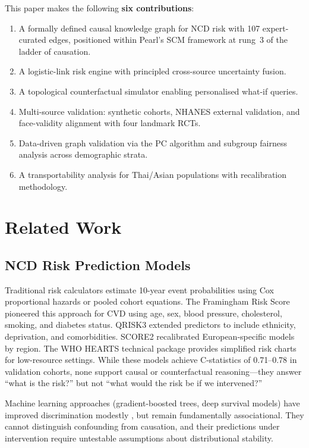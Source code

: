 \documentclass[runningheads]{llncs}
\begin{document}
This paper makes the following \textbf{six contributions}:
\begin{enumerate}
\item[(C1)] A formally defined causal knowledge graph for NCD risk
  with 107 expert-curated edges, positioned within Pearl's SCM
  framework at rung~3 of the ladder of causation.
\item[(C2)] A logistic-link risk engine with principled cross-source
  uncertainty fusion.
\item[(C3)] A topological counterfactual simulator enabling
  personalised what-if queries.
\item[(C4)] Multi-source validation: synthetic cohorts, NHANES
  external validation, and face-validity alignment with four landmark
  RCTs.
\item[(C5)] Data-driven graph validation via the PC algorithm and
  subgroup fairness analysis across demographic strata.
\item[(C6)] A transportability analysis for Thai/Asian populations
  with recalibration methodology.
\end{enumerate}

\section{Related Work}\label{sec:related}

\subsection{NCD Risk Prediction Models}

Traditional risk calculators estimate 10-year event probabilities
using Cox proportional hazards or pooled cohort equations.  The
Framingham Risk Score \cite{dagostino2008framingham} pioneered this
approach for CVD using age, sex, blood pressure, cholesterol, smoking,
and diabetes status.  QRISK3 \cite{hippisley2017qrisk3} extended
predictors to include ethnicity, deprivation, and comorbidities.
SCORE2 \cite{score22021} recalibrated European-specific models by
region.  The WHO HEARTS technical package \cite{who2016hearts}
provides simplified risk charts for low-resource settings.  While
these models achieve C-statistics of 0.71--0.78 in validation
cohorts, none support causal or counterfactual reasoning---they
answer ``what is the risk?'' but not ``what would the risk be if we
intervened?''

Machine learning approaches (gradient-boosted trees, deep survival
models) have improved discrimination modestly
\cite{alaa2019attentive}, but remain fundamentally associational.
They cannot distinguish confounding from causation, and their
predictions under intervention require untestable assumptions about
distributional stability.
\end{document}
